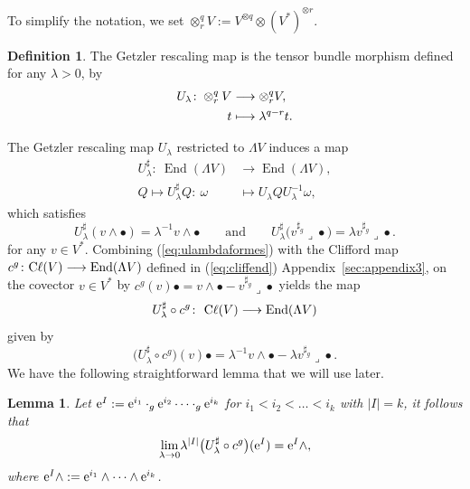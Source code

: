 \documentclass[10pt,a4paper]{amsart}
\numberwithin{equation}{section}
\newtheorem{lem}[thm]{Lemma}
\theoremstyle{definition}
\newtheorem{defn}[thm]{Definition}
\newcommand{\Cl}{{\rm C}\ell}
\begin{document}
To simplify the notation, we set $ \otimes_r^q V:=V^{\otimes q}\otimes (V^*)^{\otimes r}$.
\begin{defn} \label{getzlerrescaling}
The Getzler rescaling map is the tensor bundle morphism defined for any $\lambda>0$, by
\begin{align}
U_\lambda\colon \otimes_r^q V &\longrightarrow \otimes_r^q V, \nonumber\\
\hphantom{U_\lambda\colon}{} \ t &\longmapsto 	 \lambda^{ q-r} t.\label{eq:getzlerrescaling}
\end{align}
\end{defn}
The Getzler rescaling map $U_\lambda$ restricted to $\Lambda V$ induces a map
\begin{align}
U_\lambda^\sharp\colon \ \operatorname{End}(\Lambda V) & \longrightarrow \operatorname{End}(\Lambda V), \nonumber\\
Q \longmapsto U_\lambda^\sharp Q\colon \ \omega & \mapsto U_\lambda Q U_\lambda^{-1}\omega,\label{eq:actionulambda}
\end{align}
which satisfies
\begin{equation}\label{eq:ulambdaformes}
U_\lambda^\sharp(v\wedge\bullet)= \lambda^{-1}v\wedge\bullet \qquad\text{and}\qquad U_\lambda^{\sharp}\bigl(v^{\sharp_g}\lrcorner\bullet\bigr)= \lambda v^{\sharp_g}\lrcorner\bullet.
\end{equation}
for any $v\in V^*$. Combining (\ref{eq:ulambdaformes}) with the Clifford map $ c^g\colon \Cl(V) \longrightarrow \operatorname{End}(\Lambda V)$ defined in (\ref{eq:cliffend}) Appendix~\ref{sec:appendix3}, on the covector $v\in V^*$ by $ c^g(v)\bullet =v\wedge\bullet -v^{\sharp_g} \lrcorner\bullet$
 yields the map
 \begin{equation*}
 U_\lambda^\sharp\circ c^g\colon \ \Cl(V) \longrightarrow \operatorname{End}(\Lambda V)
 \end{equation*}
 given by
	\[ \bigl(U_\lambda^\sharp\circ c^g\bigr)(v)\bullet=\lambda^{-1} v\wedge\bullet-\lambda v^{\sharp_g}\lrcorner\bullet.\]
We have the following straightforward lemma that we will use later.

\begin{lem} Let ${\rm e}^I:={\rm e}^{i_1}\cdot_g {\rm e}^{i_2}\dots \cdot_g {\rm e}^{i_k}$ for $i_1<i_2<\dots<i_k$ with {$|I|= k$}, it follows that
\begin{equation}\label{eq:limUlambdac}
\underset{\lambda\to 0}{\lim} \lambda^{|I|}\bigl(U_\lambda^\sharp\circ c^g\bigr)({\rm e}^I)= {\rm e}^I\wedge,
\end{equation}
 where ${\rm e}^I\wedge:={\rm e}^{i_1}\wedge\dots \wedge {\rm e}^{i_k}$.
 \end{lem}
\end{document}

